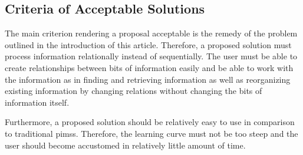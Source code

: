 \subsection{Criteria of Acceptable Solutions}

The main criterion rendering a proposal acceptable is the remedy of the problem
outlined in the introduction of this article. Therefore, a proposed solution
must process information relationally instead of sequentially. The user must be
able to create relationships between bits of information easily and be able to
work with the information as in finding and retrieving information as well as
reorganizing existing information by changing relations without changing the
bits of information itself.

Furthermore, a proposed solution should be relatively easy to use in comparison
to traditional \glspl{pims}. Therefore, the learning curve must not be too
steep and the user should become accustomed in relatively little amount of time.
